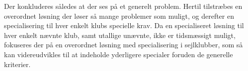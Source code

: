 Der konkluderes således at der ses på et generelt problem. Hertil tilstræbes en overordnet løsning der løser så mange problemer som muligt, og derefter en specialisering til hver enkelt klubs specielle krav. Da en specialiseret løsning til hver enkelt nævnte klub, samt utallige unævnte, ikke er tidsmæssigt muligt, fokuseres der på en overordnet løsning med specialisering i sejlklubber, som så kan videreudvikles til at indeholde yderligere specialer foruden de generelle kriterier.


\cbend
